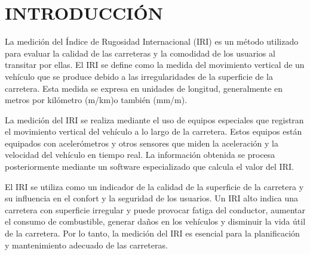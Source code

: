 \pagestyle{headings}
\clearpage
\chapter*{INTRODUCCIÓN}
La medición del Índice de Rugosidad Internacional (IRI) es un método utilizado para evaluar la calidad de las carreteras y la comodidad de los usuarios al transitar por ellas. El IRI se define como la medida del movimiento vertical de un vehículo que se produce debido a las irregularidades de la superficie de la carretera. Esta medida se expresa en unidades de longitud, generalmente en metros por kilómetro (m/km)o también (mm/m).

La medición del IRI se realiza mediante el uso de equipos especiales que registran el movimiento vertical del vehículo a lo largo de la carretera. Estos equipos están equipados con acelerómetros y otros sensores que miden la aceleración y la velocidad del vehículo en tiempo real. La información obtenida se procesa posteriormente mediante un software especializado que calcula el valor del IRI.

El IRI se utiliza como un indicador de la calidad de la superficie de la carretera y su influencia en el confort y la seguridad de los usuarios. Un IRI alto indica una carretera con superficie irregular y puede provocar fatiga del conductor, aumentar el consumo de combustible, generar daños en los vehículos y disminuir la vida útil de la carretera. Por lo tanto, la medición del IRI es esencial para la planificación y mantenimiento adecuado de las carreteras.







